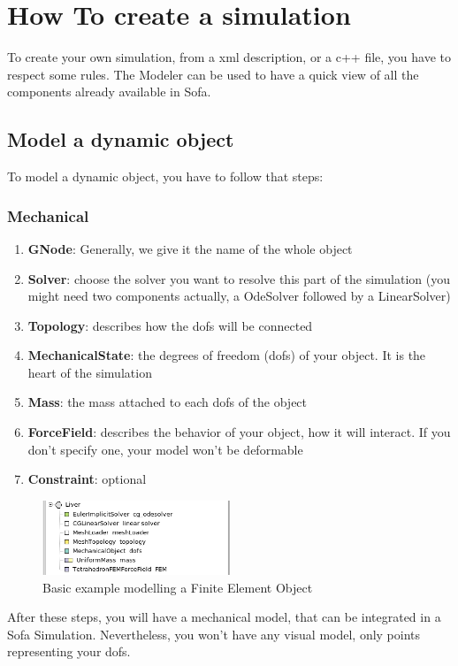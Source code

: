 
\section{How To create a simulation}
To create your own simulation, from a xml description, or a c++ file, you have to respect some rules.
The Modeler can be used to have a quick view of all the components already available in Sofa.
\subsection{Model a dynamic object}
To model a dynamic object, you have to follow that steps:
\subsubsection{Mechanical}
\begin{enumerate}
 \item { \bf GNode}: Generally, we give it the name of the whole object
 \item { \bf Solver}: choose the solver you want to resolve this part of the simulation (you might need two components actually, a OdeSolver followed by a LinearSolver)
 \item { \bf Topology}: describes how the dofs will be connected
 \item { \bf MechanicalState}: the degrees of freedom (dofs) of your object. It is the heart of the simulation
 \item { \bf Mass}: the mass attached to each dofs of the object
 \item { \bf ForceField}: describes the behavior of your object, how it will interact. If you don't specify one, your model won't be deformable
 \item { \bf Constraint}: optional
\end{enumerate}

\begin{figure}
	\centering
		\includegraphics[width=0.5\textwidth]{Modelling0.jpg}
	\caption{Basic example modelling a Finite Element Object}
\end{figure}
After these steps, you will have a mechanical model, that can be integrated in a Sofa Simulation. Nevertheless, you won't have any visual model, only points representing your dofs.


